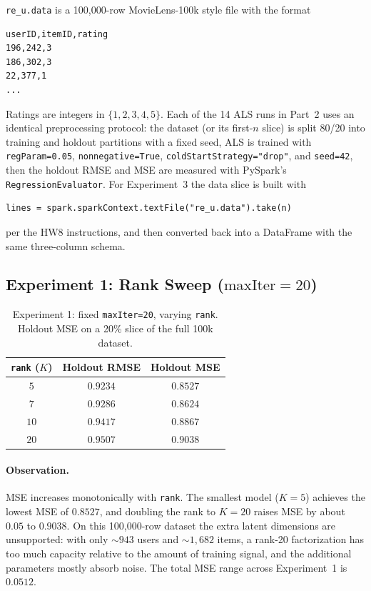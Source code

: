 \documentclass[12pt]{article}
\begin{document}
	\texttt{re\_u.data} is a 100{,}000-row MovieLens-100k style file with the format
	\begin{verbatim}
userID,itemID,rating
196,242,3
186,302,3
22,377,1
...
	\end{verbatim}
	Ratings are integers in $\{1,2,3,4,5\}$. Each of the 14 ALS runs in Part~2 uses an identical preprocessing protocol: the dataset (or its first-$n$ slice) is split 80/20 into training and holdout partitions with a fixed seed, ALS is trained with \texttt{regParam=0.05}, \texttt{nonnegative=True}, \texttt{coldStartStrategy="drop"}, and \texttt{seed=42}, then the holdout RMSE and MSE are measured with PySpark's \texttt{RegressionEvaluator}. For Experiment~3 the data slice is built with
	\begin{verbatim}
lines = spark.sparkContext.textFile("re_u.data").take(n)
	\end{verbatim}
	per the HW8 instructions, and then converted back into a DataFrame with the same three-column schema.

	\subsection{\texorpdfstring{Experiment 1: Rank Sweep ($\text{maxIter}=20$)}{Experiment 1: Rank Sweep (maxIter=20)}}\label{sec:exp1}

	\begin{table}[H]
		\centering
		\caption{Experiment 1: fixed \texttt{maxIter=20}, varying \texttt{rank}. Holdout MSE on a 20\% slice of the full 100k dataset.}\label{tab:exp1}
		\begin{tabular}{ccc}
			\toprule
			\texttt{rank} ($K$) & Holdout RMSE & Holdout MSE \\
			\midrule
			$5$  & $0.9234$ & $\mathbf{0.8527}$ \\
			$7$  & $0.9286$ & $0.8624$ \\
			$10$ & $0.9417$ & $0.8867$ \\
			$20$ & $0.9507$ & $0.9038$ \\
			\bottomrule
		\end{tabular}
	\end{table}

	\paragraph{Observation.} MSE increases monotonically with \texttt{rank}. The smallest model ($K=5$) achieves the lowest MSE of $0.8527$, and doubling the rank to $K=20$ raises MSE by about $0.05$ to $0.9038$. On this 100{,}000-row dataset the extra latent dimensions are unsupported: with only $\sim 943$ users and $\sim 1{,}682$ items, a rank-20 factorization has too much capacity relative to the amount of training signal, and the additional parameters mostly absorb noise. The total MSE range across Experiment~1 is $0.0512$.
\end{document}
